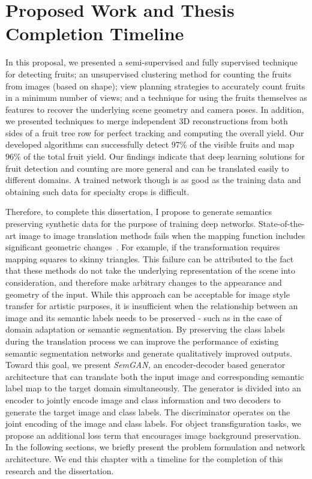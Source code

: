 \chapter{Proposed Work and Thesis Completion Timeline}
\label{chapter:proposed_work}
 In this proposal, we presented a semi-supervised and fully supervised technique for detecting fruits; an unsupervised clustering method for counting the fruits from images (based on shape); view planning strategies to accurately count fruits in a minimum number of views; and a technique for using the fruits themselves as features to recover the underlying scene geometry and camera poses. In addition, we presented techniques to merge independent 3D reconstructions from both sides of a fruit tree row for perfect tracking and computing the overall yield. Our developed algorithms can successfully detect $97\%$ of the visible fruits and map $96\%$ of the total fruit yield. Our findings indicate that deep learning solutions for fruit detection and counting are more general and can be translated easily to different domains. A trained network though is as good as the training data and obtaining such data for specialty crops is difficult.

Therefore, to complete this dissertation, I propose to generate semantics preserving synthetic data for the purpose of training deep networks. State-of-the-art image to image translation methods fails when the mapping function includes significant geometric changes~\cite{zhu_unpaired_2017}. For example, if the transformation requires mapping squares to skinny triangles. This failure can be attributed to the fact that these methods do not take the underlying representation of the scene into consideration, and therefore make arbitrary changes to the appearance and geometry of the input. While this approach can be acceptable for image style transfer for artistic purposes, it is insufficient when the relationship between an image and its semantic labels needs to be preserved - such as in the case of domain adaptation or semantic segmentation. By preserving the class labels during the translation process we can improve the performance of existing semantic segmentation networks and generate qualitatively improved outputs. Toward this goal, we present \emph{SemGAN,} an encoder-decoder based generator architecture that can translate both the input image and corresponding semantic label map to the target domain simultaneously. The generator is divided into an encoder to jointly encode image and class information and two decoders to generate the target image and class labels. The discriminator operates on the joint encoding of the image and class labels. For object transfiguration tasks, we propose an additional loss term that encourages image background preservation. In the following sections, we briefly present the problem formulation and network architecture. We end this chapter with a timeline for the completion of this research and the dissertation.


